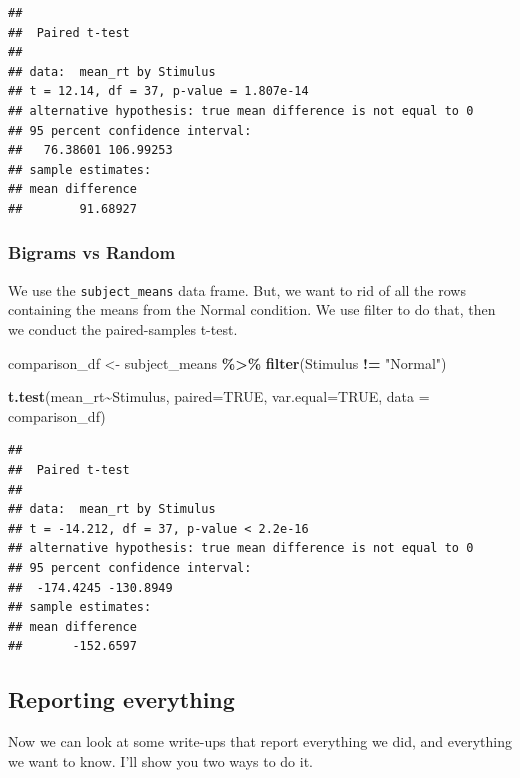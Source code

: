 \documentclass[
]{book}
\newenvironment{Shaded}{\begin{snugshade}}{\end{snugshade}}
\newcommand{\AttributeTok}[1]{\textcolor[rgb]{0.13,0.29,0.53}{#1}}
\newcommand{\ConstantTok}[1]{\textcolor[rgb]{0.56,0.35,0.01}{#1}}
\newcommand{\FunctionTok}[1]{\textcolor[rgb]{0.13,0.29,0.53}{\textbf{#1}}}
\newcommand{\NormalTok}[1]{#1}
\newcommand{\OtherTok}[1]{\textcolor[rgb]{0.56,0.35,0.01}{#1}}
\newcommand{\SpecialCharTok}[1]{\textcolor[rgb]{0.81,0.36,0.00}{\textbf{#1}}}
\newcommand{\StringTok}[1]{\textcolor[rgb]{0.31,0.60,0.02}{#1}}
\begin{document}
\begin{verbatim}
## 
##  Paired t-test
## 
## data:  mean_rt by Stimulus
## t = 12.14, df = 37, p-value = 1.807e-14
## alternative hypothesis: true mean difference is not equal to 0
## 95 percent confidence interval:
##   76.38601 106.99253
## sample estimates:
## mean difference 
##        91.68927
\end{verbatim}

\hypertarget{bigrams-vs-random}{%
\subsubsection{Bigrams vs Random}\label{bigrams-vs-random}}

We use the \texttt{subject\_means} data frame. But, we want to rid of all the rows containing the means from the Normal condition. We use filter to do that, then we conduct the paired-samples t-test.

\begin{Shaded}
\begin{Highlighting}[]
\NormalTok{comparison\_df }\OtherTok{\textless{}{-}}\NormalTok{ subject\_means }\SpecialCharTok{\%\textgreater{}\%}
                  \FunctionTok{filter}\NormalTok{(Stimulus }\SpecialCharTok{!=} \StringTok{"Normal"}\NormalTok{)}

\FunctionTok{t.test}\NormalTok{(mean\_rt}\SpecialCharTok{\textasciitilde{}}\NormalTok{Stimulus, }
       \AttributeTok{paired=}\ConstantTok{TRUE}\NormalTok{, }
       \AttributeTok{var.equal=}\ConstantTok{TRUE}\NormalTok{, }
       \AttributeTok{data =}\NormalTok{ comparison\_df)}
\end{Highlighting}
\end{Shaded}

\begin{verbatim}
## 
##  Paired t-test
## 
## data:  mean_rt by Stimulus
## t = -14.212, df = 37, p-value < 2.2e-16
## alternative hypothesis: true mean difference is not equal to 0
## 95 percent confidence interval:
##  -174.4245 -130.8949
## sample estimates:
## mean difference 
##       -152.6597
\end{verbatim}

\hypertarget{reporting-everything}{%
\subsection{Reporting everything}\label{reporting-everything}}

Now we can look at some write-ups that report everything we did, and everything we want to know. I'll show you two ways to do it.
\end{document}
